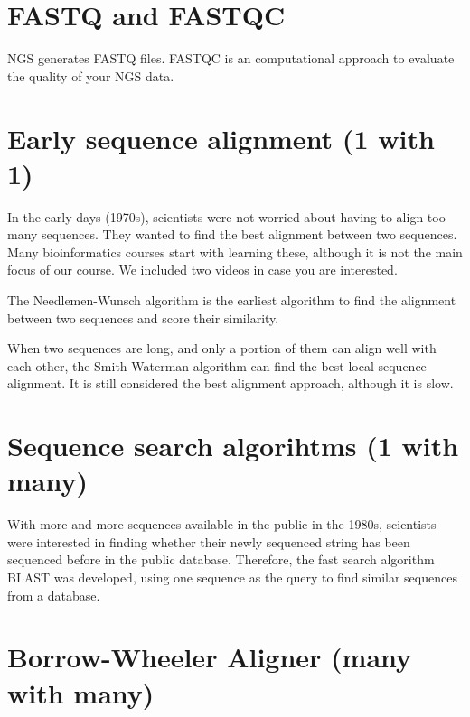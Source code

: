 \documentclass[
]{book}
\begin{document}
\hypertarget{fastq-and-fastqc}{%
\section{FASTQ and FASTQC}\label{fastq-and-fastqc}}

NGS generates FASTQ files. FASTQC is an computational approach to evaluate the quality of your NGS data.

\hypertarget{early-sequence-alignment-1-with-1}{%
\section{Early sequence alignment (1 with 1)}\label{early-sequence-alignment-1-with-1}}

In the early days (1970s), scientists were not worried about having to align too many sequences. They wanted to find the best alignment between two sequences. Many bioinformatics courses start with learning these, although it is not the main focus of our course. We included two videos in case you are interested.

The Needlemen-Wunsch algorithm is the earliest algorithm to find the alignment between two sequences and score their similarity.

When two sequences are long, and only a portion of them can align well with each other, the Smith-Waterman algorithm can find the best local sequence alignment. It is still considered the best alignment approach, although it is slow.

\hypertarget{sequence-search-algorihtms-1-with-many}{%
\section{Sequence search algorihtms (1 with many)}\label{sequence-search-algorihtms-1-with-many}}

With more and more sequences available in the public in the 1980s, scientists were interested in finding whether their newly sequenced string has been sequenced before in the public database. Therefore, the fast search algorithm BLAST was developed, using one sequence as the query to find similar sequences from a database.

\hypertarget{borrow-wheeler-aligner-many-with-many}{%
\section{Borrow-Wheeler Aligner (many with many)}\label{borrow-wheeler-aligner-many-with-many}}
\end{document}
